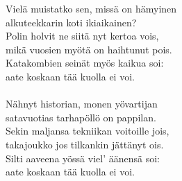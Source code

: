
Vielä muistatko sen, missä on hämyinen \\ alkuteekkarin koti ikiaikainen? \\ Polin holvit ne siitä nyt kertoa vois, \\ mikä vuosien myötä on haihtunut pois. \\ Katakombien seinät myös kaikua soi: \\ aate koskaan tää kuolla ei voi. \\ \hspace{10mm} \\ Nähnyt historian, monen yövartijan \\ satavuotias tarhapöllö on pappilan. \\ Sekin maljansa tekniikan voitoille jois, \\ takajoukko jos tilkankin jättänyt ois. \\ Silti aaveena yössä viel' äänensä soi: \\ aate koskaan tää kuolla ei voi.